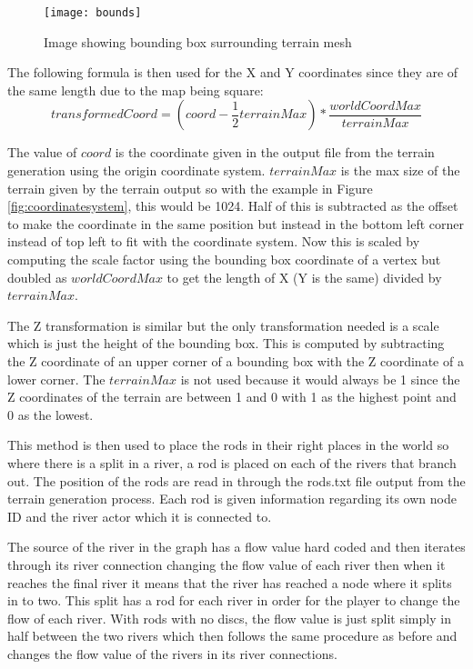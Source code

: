 \begin{figure}[H]
	\texttt{[image: bounds]}
	\centering
	\caption{Image showing bounding box surrounding terrain mesh}
	\label{fig:boundingbox}
\end{figure}

The following formula is then used for the X and Y coordinates since they are of the same length due to the map being square:
\[transformedCoord = (coord - \frac{1}{2}terrainMax) * \frac{worldCoordMax}{terrainMax}\]

The value of \(coord\) is the coordinate given in the output file from the terrain generation using the origin coordinate system. \(terrainMax\) is the max size of the terrain given by the terrain output so with the example in Figure \ref{fig:coordinatesystem}, this would be 1024. Half of this is subtracted as the offset to make the coordinate in the same position but instead in the bottom left corner instead of top left to fit with the coordinate system. Now this is scaled by computing the scale factor using the bounding box coordinate of a vertex but doubled as \(worldCoordMax\) to get the length of X (Y is the same) divided by \(terrainMax\).
\newline
\par
The Z transformation is similar but the only transformation needed is a scale which is just the height of the bounding box. This is computed by subtracting the Z coordinate of an upper corner of a bounding box with the Z coordinate of a lower corner. The \(terrainMax\) is not used because it would always be 1 since the Z coordinates of the terrain are between 1 and 0 with 1 as the highest point and 0 as the lowest.
\newline
\par
This method is then used to place the rods in their right places in the world so where there is a split in a river, a rod is placed on each of the rivers that branch out. The position of the rods are read in through the rods.txt file output from the terrain generation process. Each rod is given information regarding its own node ID and the river actor which it is connected to.
\newline
\par
The source of the river in the graph has a flow value hard coded and then iterates through its river connection changing the flow value of each river then when it reaches the final river it means that the river has reached a node where it splits in to two. This split has a rod for each river in order for the player to change the flow of each river. With rods with no discs, the flow value is just split simply in half between the two rivers which then follows the same procedure as before and changes the flow value of the rivers in its river connections.
